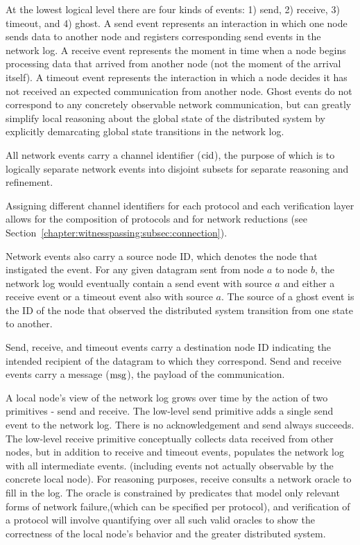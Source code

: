 At the lowest logical level there are four kinds of events: 1) send, 2) receive,
3) timeout, and 4) ghost. A send event represents an interaction in which one
node sends data to another node and registers corresponding send events in the
network log. A receive event represents the moment in time when a node begins
processing data that arrived from another node (not the moment of the arrival
itself). A timeout event represents the interaction in which a node decides it
has not received an expected communication from another node. Ghost events do
not correspond to any concretely observable network communication, but can
greatly simplify local reasoning about the global state of the distributed
system by explicitly demarcating global state transitions in the network log.

All network events carry a channel identifier ($\mathrm{cid}$), the purpose of which is
to logically separate network events into disjoint subsets for separate
reasoning and refinement.  Assigning different channel identifiers for each
protocol and each verification layer allows for the composition of protocols and
for network reductions (see Section~\ref{chapter:witnesspassing:subsec:connection}).

Network events also carry a source node ID, which denotes the node that
instigated the event. For any given datagram sent from node $a$ to node $b$, the
network log would eventually contain a send event with source $a$ and either a
receive event or a timeout event also with source $a$. The source of a ghost
event is the ID of the node that observed the distributed system transition from
one state to another.  Send, receive, and timeout events carry a
destination node ID indicating the intended recipient of the datagram to which
they correspond. Send and receive events carry a message ($\mathrm{msg}$), the payload
of the communication.

A local node's view of the network log grows over time by the action of two
primitives - send and receive. The low-level send primitive adds a single send
event to the network log. There is no acknowledgement and send always succeeds.
The low-level receive primitive conceptually collects data received from other
nodes, but in addition to receive and timeout events, populates the network log
with all intermediate events. (including events not actually observable by the
concrete local node). For reasoning purposes, receive consults a network oracle
to fill in the log. The oracle is constrained by predicates that model only
relevant forms of network failure,(which can be specified per protocol), and
verification of a protocol will involve quantifying over all such valid oracles
to show the correctness of the local node's behavior and the greater distributed
system.


